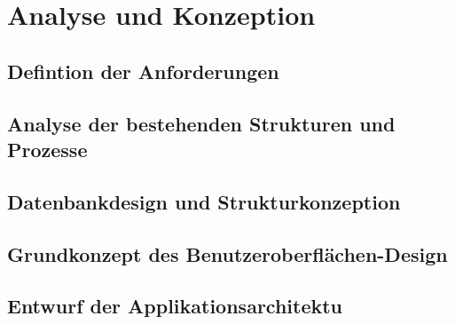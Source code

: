 \newpage
\section{Analyse und Konzeption}
\label{Analyse und Konzeption}

\subsection{Defintion der Anforderungen}

\subsection{Analyse der bestehenden Strukturen und Prozesse}

\subsection{Datenbankdesign und Strukturkonzeption}

\subsection{Grundkonzept des Benutzeroberflächen-Design}

\subsection{Entwurf der Applikationsarchitektu}